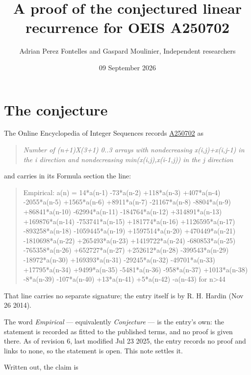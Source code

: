 \documentclass[11pt]{article}
\title{A proof of the conjectured linear recurrence for OEIS A250702}
\author{Adrian Perez Fontelles and Gaspard Moulinier, Independent researchers}
\date{09 September 2026}
\theoremstyle{definition}
\begin{document}
\maketitle
\section{The conjecture}

The Online Encyclopedia of Integer Sequences records \href{https://oeis.org/A250702}{A250702} as

\begin{quote}\itshape Number of (n+1)X(3+1) 0..3 arrays with nondecreasing x(i,j)+x(i,j-1) in the i direction and nondecreasing min(x(i,j),x(i-1,j)) in the j direction\end{quote}

and carries in its Formula section the line:

\begin{quote}\ttfamily Empirical: a(n) = 14*a(n-1) -73*a(n-2) +118*a(n-3) +407*a(n-4) -2055*a(n-5) +1565*a(n-6) +8911*a(n-7) -21167*a(n-8) -8804*a(n-9) +86841*a(n-10) -62994*a(n-11) -184764*a(n-12) +314891*a(n-13) +169876*a(n-14) -753741*a(n-15) +181774*a(n-16) +1126595*a(n-17) -893258*a(n-18) -1059445*a(n-19) +1597514*a(n-20) +470449*a(n-21) -1810698*a(n-22) +265493*a(n-23) +1419722*a(n-24) -680853*a(n-25) -765358*a(n-26) +652727*a(n-27) +252612*a(n-28) -399543*a(n-29) -18972*a(n-30) +169393*a(n-31) -29245*a(n-32) -49701*a(n-33) +17795*a(n-34) +9499*a(n-35) -5481*a(n-36) -958*a(n-37) +1013*a(n-38) -8*a(n-39) -107*a(n-40) +13*a(n-41) +5*a(n-42) -a(n-43) for n>44\end{quote}

That line carries no separate signature; the entry itself is by R. H. Hardin (Nov 26 2014).

The word {\itshape Empirical} --- equivalently {\itshape Conjecture} --- is the entry's own: the statement is recorded as fitted to the published terms, and no proof is given there. As of revision 6, last modified Jul 23 2025, the entry records no proof and links to none, so the statement is open. This note settles it.

Written out, the claim is
\end{document}
